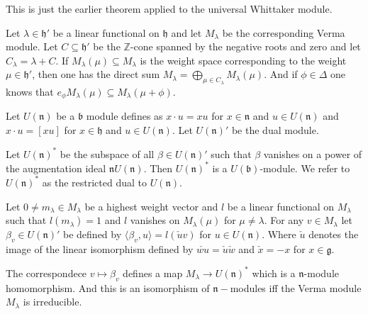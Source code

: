 \documentclass{article}
\theoremstyle{mytheoremstyle}
\theoremstyle{mytheoremstyle}
\theoremstyle{myproblemstyle}
\begin{document}
    \begin{remark}
    	This is just the earlier theorem applied to the universal Whittaker module.
    \end{remark}
    
    Let $\lambda \in \mathfrak{h}'$ be a linear functional on $\mathfrak{h}$ and let $M_\lambda$ be the corresponding
    Verma module. Let $C \subseteq \mathfrak{h}'$ be the $\mathbb{Z}$-cone spanned by the negative roots and zero and 
    let $C_\lambda = \lambda + C$. If $M_\lambda(\mu) \subseteq M_\lambda$ is the weight space corresponding to the weight
    $\mu \in \mathfrak{h}'$, then one has the direct sum $M_\lambda = \bigoplus_{\mu \in C_\lambda} M_\lambda(\mu)$.
    And if $\phi \in \Delta$ one knows that $e_\phi M_\lambda(\mu) \subseteq M_\lambda(\mu + \phi)$.

    Let $U(\mathfrak{n})$ be a $\mathfrak{b}$ module defines as $x \cdot u = x u$ for $x \in \mathfrak{n}$ and 
    $u \in U(\mathfrak{n})$ and $x \cdot u = [x u] $ for $x \in \mathfrak{h}$ and $u \in U(\mathfrak{n})$.
    Let $U(\mathfrak{n})'$ be the dual module. 

    \begin{definition}
      Let $U(\mathfrak{n})^*$ be the subspace of all $\beta \in U(\mathfrak{n})'$ such that $\beta$ vanishes on a power of
      the augmentation ideal $\mathfrak{n}U(\mathfrak{n})$. Then $U(\mathfrak{n})^*$ is a $U(\mathfrak{b})$-module.
      We refer to $U(\mathfrak{n})^*$ as the restricted dual to $U(\mathfrak{n})$.
    \end{definition}

    Let $0 \neq m_\lambda \in M_\lambda$ be a highest weight vector and $l$ be a linear functional 
    on $M_\lambda$ such that $l(m_\lambda) = 1$ and $l$ vanishes on $M_\lambda(\mu)$ for $\mu \neq \lambda$.
    For any $v \in M_\lambda$ let $\beta_v \in U(\mathfrak{n})'$ be defined by 
    $\langle \beta_v, u \rangle = l(\check uv)$ for $u \in U(\mathfrak{n})$.
    Where $\check u$ denotes the image of the linear isomorphism defined by $\check{wu} = \check u \check w$ 
    and $\check x = -x$ for $x \in \mathfrak{g}$.

    \begin{lemma}
    	The correspondece $v \mapsto \beta_v$ defines a map $M_\lambda \to U(\mathfrak{n})^*$ which is a 
	$\mathfrak{n}$-module homomorphism. And this is an isomorphism of $\mathfrak{n}-$modules iff 
	the Verma module $M_\lambda$ is irreducible.
    \end{lemma}
\end{document}
